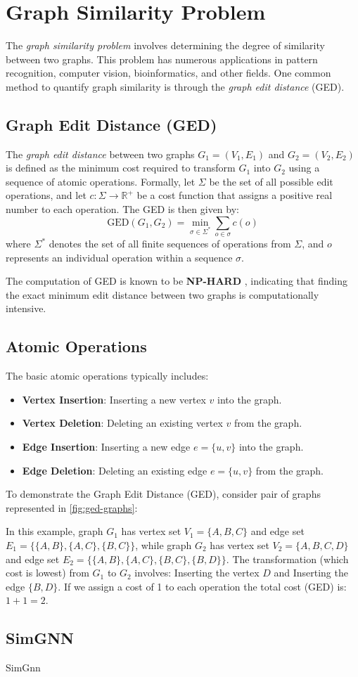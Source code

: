 \section{Graph Similarity Problem}
\label{sec:graph_similarity_problem}
The \emph{graph similarity problem} involves determining the degree of similarity between two graphs. This problem has numerous applications in pattern recognition, computer vision, bioinformatics, and other fields. One common method to quantify graph similarity is through the \emph{graph edit distance} (GED).

\subsection{Graph Edit Distance (GED)}
The \emph{graph edit distance} between two graphs $G_1 = (V_1, E_1)$ and $G_2 = (V_2, E_2)$ is defined as the minimum cost required to transform $G_1$ into $G_2$ using a sequence of atomic operations. Formally, let $\Sigma$ be the set of all possible edit operations, and let $c: \Sigma \to \mathbb{R}^+$ be a cost function that assigns a positive real number to each operation. The GED is then given by:
\[
\text{GED}(G_1, G_2) = \min_{\sigma \in \Sigma^*} \sum_{o \in \sigma} c(o)
\]
where $\Sigma^*$ denotes the set of all finite sequences of operations from $\Sigma$, and $o$ represents an individual operation within a sequence $\sigma$.

The computation of GED is known to be \textbf{NP-HARD} \cite{NP_HARDNESS}, indicating that finding the exact minimum edit distance between two graphs is computationally intensive.

\subsection{Atomic Operations}
The basic atomic operations typically includes:
\begin{itemize}
    \item \textbf{Vertex Insertion}: Inserting a new vertex $v$ into the graph.
    \item \textbf{Vertex Deletion}: Deleting an existing vertex $v$ from the graph.
    \item \textbf{Edge Insertion}: Inserting a new edge $e = \{u, v\}$ into the graph.
    \item \textbf{Edge Deletion}: Deleting an existing edge $e = \{u, v\}$ from the graph.
\end{itemize}
To demonstrate the Graph Edit Distance (GED), consider pair of graphs represented in \autoref{fig:ged-graphs}:

In this example, graph $G_1$ has vertex set $V_1 = \{A, B, C\}$ and edge set $E_1 = \{\{A, B\}, \{A, C\}, \{B, C\}\}$, while graph $G_2$ has vertex set $V_2 = \{A, B, C, D\}$ and edge set $E_2 = \{\{A, B\}, \{A, C\}, \{B, C\}, \{B, D\}\}$. The transformation (which cost is lowest) from $G_1$ to $G_2$ involves: Inserting the vertex $D$ and Inserting the edge $\{B, D\}$. If we assign a cost of 1 to each operation the total cost (GED) is: $1+1=2$.

\subsection{SimGNN}
SimGnn